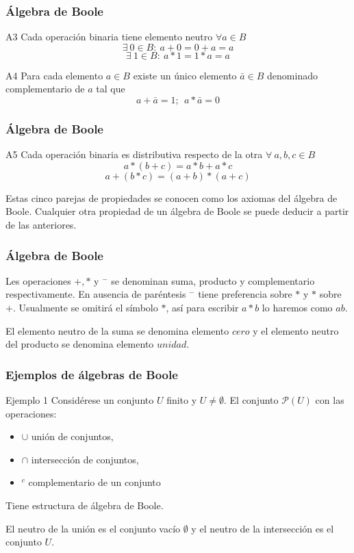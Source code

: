 \documentclass{beamer}
\begin{document}
\begin{frame}
\frametitle{\'Algebra de Boole}
\begin{block}{A3}
Cada operaci\'on binaria tiene elemento neutro $\forall a\in B$
\[\exists\ 0\in B :\ a+0 = 0+a = a\]
\[\exists\ 1\in B :\ a*1 = 1*a = a\]
\end{block}


\begin{block}{A4}
Para cada elemento $a\in B$ existe un \'unico elemento $\bar{a}\in B$ denominado complementario de $a$ tal que 
\[a+\bar{a} = 1;\ \ a*\bar{a} = 0\]
\end{block}
\end{frame}

\begin{frame}
\frametitle{\'Algebra de Boole}
\begin{block}{A5}
Cada operaci\'on binaria es distributiva respecto de la otra $\forall\ a,b,c\in B$
\[a*(b+c) = a*b+a*c\]
\[a+(b*c) = (a+b)*(a+c)\]
\end{block}

Estas cinco parejas de propiedades se conocen como los axiomas del \'algebra de Boole. Cualquier otra propiedad de un \'algebra de Boole se puede deducir a partir de las anteriores.
\end{frame}




\begin{frame}
\frametitle{\'Algebra de Boole}
Les operaciones $+,*$ y ${}^-$  se denominan suma, producto y complementario respectivamente. En ausencia de par\'entesis ${}^-$ tiene preferencia sobre $*$ y $*$ sobre $+$. Usualmente se omitir\'a el s\'imbolo $*$, as\'i para escribir $a*b$ lo haremos como $ab$.


El elemento neutro de la suma se denomina elemento $cero$ y el elemento neutro del producto se denomina elemento $unidad$.

\end{frame}




\begin{frame}
\frametitle{Ejemplos de \'algebras de Boole}
\begin{block}{Ejemplo 1}
Consid\'erese un conjunto $U$ finito y $U\neq \emptyset$. El conjunto $\mathcal{P}(U)$ con las operaciones: 
\begin{itemize}
\item $\cup$ uni\'on de conjuntos, 
\item $\cap$ intersecci\'on de conjuntos,
\item ${}^c$ complementario de un conjunto 
\end{itemize}
Tiene estructura de \'algebra de Boole.

El neutro de la uni\'on es el conjunto vac\'io $\emptyset$ y el neutro de la intersecci\'on es el conjunto $U$.

\end{block}
\end{frame}
\end{document}
